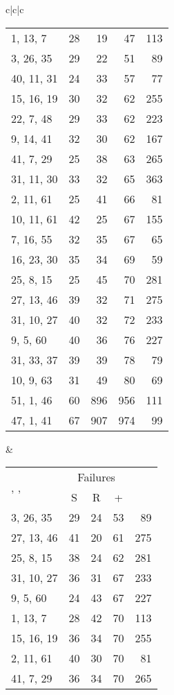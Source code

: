 \documentclass{acmsmalltr}
\newcommand{\xst}[3]{#1, #2, #3}
\begin{document}
\begin{sidewaystable}
{\begin{tabular}{c|c|c}
\begin{tabular}{l|rr|r|r}
\hline
\xst{1}{13}{7} & 28 & 19 & 47 & 113\\
\xst{3}{26}{35} & 29 & 22 & 51 & 89\\
\xst{40}{11}{31} & 24 & 33 & 57 & 77\\
\xst{15}{16}{19} & 30 & 32 & 62 & 255\\
\xst{22}{7}{48} & 29 & 33 & 62 & 223\\
\xst{9}{14}{41} & 32 & 30 & 62 & 167\\
\xst{41}{7}{29} & 25 & 38 & 63 & 265\\
\xst{31}{11}{30} & 33 & 32 & 65 & 363\\
\xst{2}{11}{61} & 25 & 41 & 66 & 81\\
\xst{10}{11}{61} & 42 & 25 & 67 & 155\\
\xst{7}{16}{55} & 32 & 35 & 67 & 65\\
\xst{16}{23}{30} & 35 & 34 & 69 & 59\\
\xst{25}{8}{15} & 25 & 45 & 70 & 281\\
\xst{27}{13}{46} & 39 & 32 & 71 & 275\\
\xst{31}{10}{27} & 40 & 32 & 72 & 233\\
\xst{9}{5}{60} & 40 & 36 & 76 & 227\\
\xst{31}{33}{37} & 39 & 39 & 78 & 79\\
\xst{10}{9}{63} & 31 & 49 & 80 & 69\\
\xst{51}{1}{46} & 60 & 896 & 956 & 111\\
\xst{47}{1}{41} & 67 & 907 & 974 & 99\\
\end{tabular}&
\begin{tabular}{l|rr|r|r}
\multirow{2}{*}{, , } & \multicolumn{3}{c|}{Failures}  & \multirow{2}{*}{}\\
& \multicolumn{1}{c}{S} & \multicolumn{1}{c|}{R} & \multicolumn{1}{c|}{+} \\
\hline
\xst{3}{26}{35} & 29 & 24 & 53 & 89\\
\xst{27}{13}{46} & 41 & 20 & 61 & 275\\
\xst{25}{8}{15} & 38 & 24 & 62 & 281\\
\xst{31}{10}{27} & 36 & 31 & 67 & 233\\
\xst{9}{5}{60} & 24 & 43 & 67 & 227\\
\xst{1}{13}{7} & 28 & 42 & 70 & 113\\
\xst{15}{16}{19} & 36 & 34 & 70 & 255\\
\xst{2}{11}{61} & 40 & 30 & 70 & 81\\
\xst{41}{7}{29} & 36 & 34 & 70 & 265\\

\end{tabular}
\end{tabular}}
\end{sidewaystable}
\end{document}
